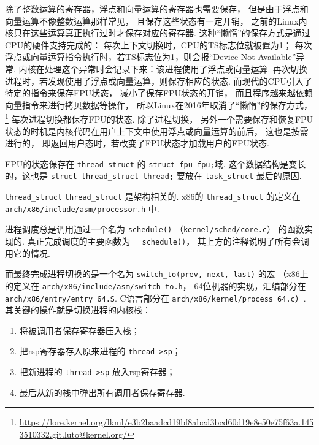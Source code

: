 除了整数运算的寄存器，浮点和向量运算的寄存器也需要保存，
但是由于浮点和向量运算不像整数运算那样常见，
且保存这些状态有一定开销，
之前的Linux内核只在这些运算真正执行过时才保存对应的寄存器.
这种“懒惰”的保存方式是通过CPU的硬件支持完成的：
每次上下文切换时，CPU的TS标志位就被置为1；
每次浮点或向量运算指令执行时，若TS标志位为1，则会报“Device Not Available”异常.
内核在处理这个异常时会记录下来：该进程使用了浮点或向量运算.
再次切换进程时，若发现使用了浮点或向量运算，则保存相应的状态.\cite{bovet2005understanding}
而现代的CPU引入了特定的指令来保存FPU状态，
减小了保存FPU状态的开销，
而且程序越来越依赖向量指令来进行拷贝数据等操作，
所以Linux在2016年取消了“懒惰”的保存方式，
\footnote{\url{https://lore.kernel.org/lkml/e3b2baadcd19bf8abcd3bcd60d19e8e50e75f63a.1453510332.git.luto@kernel.org/}}
每次进程切换都保存FPU的状态.
除了进程切换，
另外一个需要保存和恢复FPU状态的时机是内核代码在用户上下文中使用浮点或向量运算的前后，
这也是按需进行的，
即返回用户态时，若改变了FPU状态才加载用户的FPU状态.

FPU的状态保存在 \lstinline{thread_struct} 的 \lstinline{struct fpu fpu;}域.
这个数据结构是变长的，这也是 \lstinline{struct thread_struct thread;}
要放在 \lstinline{task_struct} 最后的原因.

\begin{readsrcbox}{\lstinline{thread_struct}}
	\lstinline{thread_struct} 是架构相关的.
	x86的 \lstinline{thread_struct} 的定义在 \lstinline{arch/x86/include/asm/processor.h} 中.

	进程调度总是调用通过一个名为 \lstinline{schedule()}
	（\lstinline{kernel/sched/core.c}） 的函数实现的.
	真正完成调度的主要函数为 \lstinline{__schedule()}，
	其上方的注释说明了所有会调用它的情况.

	而最终完成进程切换的是一个名为 \lstinline{switch_to(prev, next, last)} 的宏
	（x86上的定义在 \lstinline{arch/x86/include/asm/switch_to.h}，
	64位机器的实现，汇编部分在 \lstinline{arch/x86/entry/entry_64.S}.
	C语言部分在 \lstinline{arch/x86/kernel/process_64.c}）.
	其关键的操作就是切换进程的内核栈：
	\begin{enumerate}
		\item 将被调用者保存寄存器压入栈；
		\item 把rsp寄存器存入原来进程的 \lstinline{thread->sp}；
		\item 把新进程的 \lstinline{thread->sp} 放入rsp寄存器；
		\item 最后从新的栈中弹出所有调用者保存寄存器.
	\end{enumerate}
\end{readsrcbox}

